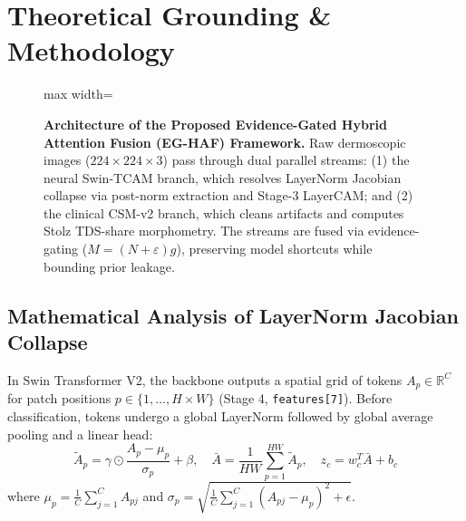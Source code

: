 \documentclass[11pt,a4paper]{article}
\begin{document}
\section{Theoretical Grounding \& Methodology}
\label{sec:methodology}

\begin{figure}[t]
\centering
\begin{adjustbox}{max width=\textwidth}

\end{adjustbox}
\caption{\textbf{Architecture of the Proposed Evidence-Gated Hybrid Attention Fusion (EG-HAF) Framework.} Raw dermoscopic images ($224\times224\times3$) pass through dual parallel streams: (1) the neural Swin-TCAM branch, which resolves LayerNorm Jacobian collapse via post-norm extraction and Stage-3 LayerCAM; and (2) the clinical CSM-v2 branch, which cleans artifacts and computes Stolz TDS-share morphometry. The streams are fused via evidence-gating ($M = (N+\varepsilon)g$), preserving model shortcuts while bounding prior leakage.}
\label{fig:tikz_architecture}
\end{figure}

\subsection{Mathematical Analysis of LayerNorm Jacobian Collapse}
\label{sec:layernorm_math}
In Swin Transformer V2, the backbone outputs a spatial grid of tokens $A_p \in \mathbb{R}^C$ for patch positions $p \in \{1, \dots, H \times W\}$ (Stage 4, \texttt{features[7]}). Before classification, tokens undergo a global LayerNorm followed by global average pooling and a linear head:
\begin{equation}
\tilde{A}_p = \gamma \odot \frac{A_p - \mu_p}{\sigma_p} + \beta, \quad \bar{A} = \frac{1}{HW}\sum_{p=1}^{HW} \tilde{A}_p, \quad z_c = w_c^T \bar{A} + b_c
\end{equation}
where $\mu_p = \frac{1}{C}\sum_{j=1}^C A_{pj}$ and $\sigma_p = \sqrt{\frac{1}{C}\sum_{j=1}^C (A_{pj} - \mu_p)^2 + \epsilon}$.
\end{document}
